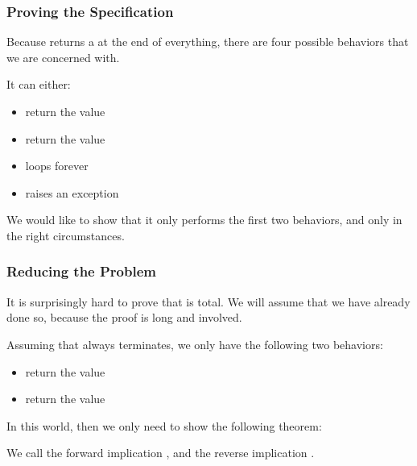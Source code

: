 \documentclass[aspectratio=169]{beamer}
\begin{document}
\begin{frame}[fragile]
  \frametitle{Proving the Specification}

  Because  returns a  at the end of everything, there
  are four possible behaviors that we are concerned with.

  \pause
  \vspace{\fill}

  It can either:
  \begin{itemize}
    \item return the value 
    \item return the value 
    \item loops forever
    \item raises an exception
  \end{itemize}

  \pause
  \vspace{\fill}

  We would like to show that it only performs the first two behaviors, and only
  in the right circumstances.
\end{frame}

\begin{frame}[fragile]
  \frametitle{Reducing the Problem}

  \ptmt

  It is surprisingly hard to prove that  is total. We will assume that
  we have already done so, because the proof is long and involved.

  \pause
  \vspace{\fill}


  \pause
  \vspace{\fill}

  Assuming that  always terminates, we only have the following
  two behaviors:
  \begin{itemize}
    \item return the value 
    \item return the value 
  \end{itemize}

  \pause
  \vspace{\fill}

  In this world, then we only need to show the following theorem:

  \vspace{5pt}

  \pause
  \vspace{\fill}

  We call the forward implication , and the reverse implication
  .
\end{frame}
\end{document}
